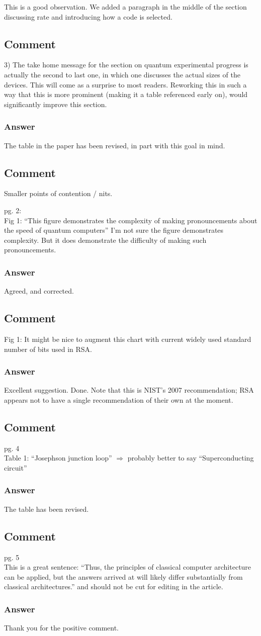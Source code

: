 \documentclass{article}
\newcommand{\comment}{\subsection{Comment}\em}
\newcommand{\answer}{\rm \subsubsection*{Answer}}
\begin{document}
This is a good observation.  We added a paragraph in the middle of the
section discussing rate and introducing how a code is selected.

\comment

3) The take home message for the section on quantum experimental
progress is actually the second to last one, in which one discusses
the actual sizes of the devices.  This will come as a surprise to most
readers. Reworking this in such a way that this is more prominent
(making it a table referenced early on), would significantly improve
this section.

\answer

The table in the paper has been revised, in part with this goal in
mind.

\comment


Smaller points of contention / nits.

pg. 2:\\
Fig 1: ``This figure demonstrates the complexity of making pronouncements about the speed of quantum computers''
I'm not sure the figure demonstrates complexity.  But it does demonstrate the difficulty of making such pronouncements.

\answer

Agreed, and corrected.

\comment

Fig 1: It might be nice to augment this chart with current widely used standard number of bits used in RSA.

\answer

Excellent suggestion.  Done.  Note that this is NIST's 2007
recommendation; RSA appears not to have a single recommendation of
their own at the moment.

\comment

pg. 4 \\
Table 1: ``Josephson junction loop'' $\Rightarrow$ probably better to say ``Superconducting circuit''

\answer

The table has been revised.

\comment

pg. 5\\
This is a great sentence: ``Thus, the principles of classical computer
architecture can be applied, but the answers arrived at will likely
differ substantially from classical architectures.'' and should not be
cut for editing in the article.

\answer

Thank you for the positive comment.
\end{document}
